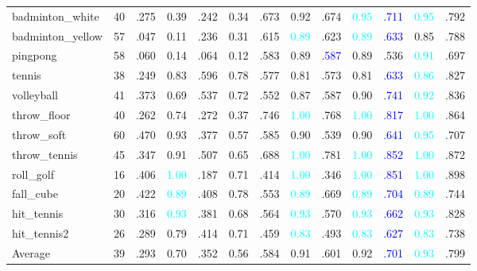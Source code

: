 \documentclass[10pt,twocolumn,letterpaper]{article}
\begin{document}
\begin{table*}
\begin{center}
\begin{tabular}{l|r|c|c|c|c|c|c|c|c|c|c|c}
badminton\_white & 40 & .275 & 0.39 & .242 & 0.34 & .673 & 0.92 & .674 & \textcolor{cyan}{0.95} & \textcolor{blue}{.711} & \textcolor{cyan}{0.95} & .792\\  
 badminton\_yellow & 57 & .047 & 0.11 & .236 & 0.31 & .615 & \textcolor{cyan}{0.89} & .623 & \textcolor{cyan}{0.89} & \textcolor{blue}{.633} & 0.85 & .788\\  
 pingpong & 58 & .060 & 0.14 & .064 & 0.12 & .583 & 0.89 & \textcolor{blue}{.587} & 0.89 & .536 & \textcolor{cyan}{0.91} & .697\\  
 tennis & 38 & .249 & 0.83 & .596 & 0.78 & .577 & 0.81 & .573 & 0.81 & \textcolor{blue}{.633} & \textcolor{cyan}{0.86} & .827\\  
 volleyball & 41 & .373 & 0.69 & .537 & 0.72 & .552 & 0.87 & .587 & 0.90 & \textcolor{blue}{.741} & \textcolor{cyan}{0.92} & .836\\  
 throw\_floor & 40 & .262 & 0.74 & .272 & 0.37 & .746 & \textcolor{cyan}{1.00} & .768 & \textcolor{cyan}{1.00} & \textcolor{blue}{.817} & \textcolor{cyan}{1.00} & .864\\  
 throw\_soft & 60 & .470 & 0.93 & .377 & 0.57 & .585 & 0.90 & .539 & 0.90 & \textcolor{blue}{.641} & \textcolor{cyan}{0.95} & .707\\  
 throw\_tennis & 45 & .347 & 0.91 & .507 & 0.65 & .688 & \textcolor{cyan}{1.00} & .781 & \textcolor{cyan}{1.00} & \textcolor{blue}{.852} & \textcolor{cyan}{1.00} & .872\\  
 roll\_golf & 16 & .406 & \textcolor{cyan}{1.00} & .187 & 0.71 & .414 & \textcolor{cyan}{1.00} & .346 & \textcolor{cyan}{1.00} & \textcolor{blue}{.851} & \textcolor{cyan}{1.00} & .898\\  
 fall\_cube & 20 & .422 & \textcolor{cyan}{0.89} & .408 & 0.78 & .553 & \textcolor{cyan}{0.89} & .669 & \textcolor{cyan}{0.89} & \textcolor{blue}{.704} & \textcolor{cyan}{0.89} & .744\\  
 hit\_tennis & 30 & .316 & \textcolor{cyan}{0.93} & .381 & 0.68 & .564 & \textcolor{cyan}{0.93} & .570 & \textcolor{cyan}{0.93} & \textcolor{blue}{.662} & \textcolor{cyan}{0.93} & .828\\  
 hit\_tennis2 & 26 & .289 & 0.79 & .414 & 0.71 & .459 & \textcolor{cyan}{0.83} & .493 & \textcolor{cyan}{0.83} & \textcolor{blue}{.627} & \textcolor{cyan}{0.83} & .738\\  
 \hline 
  Average  & 39 & .293 & 0.70 & .352 & 0.56 & .584 & 0.91 & .601 & 0.92 & \textcolor{blue}{.701} & \textcolor{cyan}{0.93} & .799\\



\end{tabular}
\end{center}
\end{table*}
\end{document}
